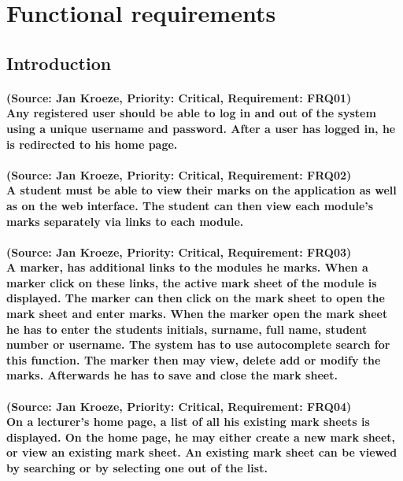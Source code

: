 \documentclass[12pt]{article}
\begin{document}
  \section{Functional requirements}
  \subsection{Introduction}
  \paragraph{(Source: Jan Kroeze, Priority: Critical, Requirement: FRQ01) \\
  Any registered user should be able to log in and out of the system using a unique username and password. After a user has logged in, he is redirected to his home page.}
  \paragraph{(Source: Jan Kroeze, Priority: Critical, Requirement: FRQ02) \\
  A student must be able to view their marks on the application as well as on  the web interface. The student can then view each module's marks separately via links to each module. }
  \paragraph{(Source: Jan Kroeze, Priority: Critical, Requirement: FRQ03) \\
  A marker, has additional links to the modules he marks. When a marker click on these links, the active mark sheet of the module is displayed. The marker can then click on the mark sheet to open the mark sheet and enter marks. When the marker open the mark sheet he has to enter the students initials, surname, full name, student number or username. The system has to use autocomplete search for this function. The marker then may view, delete add or modify the marks. Afterwards he has to save and close the mark sheet.}
  \paragraph{(Source: Jan Kroeze, Priority: Critical, Requirement: FRQ04) \\
  On a lecturer's home page, a list of all his existing mark sheets is displayed. On the home page, he may either create a new mark sheet, or view an existing mark sheet. An existing mark sheet can be viewed by searching or by selecting one out of the list.}
\end{document}
